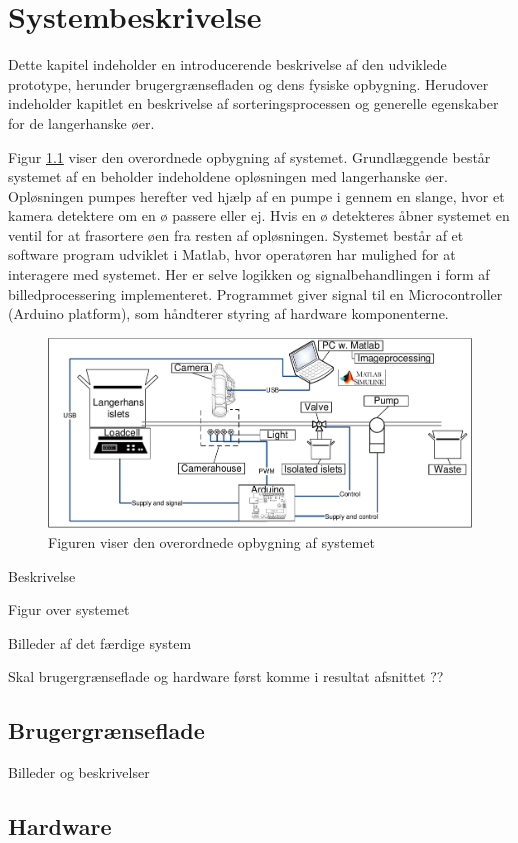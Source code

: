 \chapter{Systembeskrivelse}
Dette kapitel indeholder en introducerende beskrivelse af den udviklede prototype, herunder brugergrænsefladen og dens fysiske opbygning. Herudover indeholder kapitlet en beskrivelse af sorteringsprocessen og generelle egenskaber for de langerhanske øer.

Figur \ref{fig:system} viser den overordnede opbygning af systemet. Grundlæggende består systemet af en beholder indeholdene opløsningen med langerhanske øer. Opløsningen pumpes herefter ved hjælp af en pumpe i gennem en slange, hvor et kamera detektere om en ø passere eller ej. Hvis en ø detekteres åbner systemet en ventil for at frasortere øen fra resten af opløsningen. Systemet består af et software program udviklet i Matlab, hvor operatøren har mulighed for at interagere med systemet. Her er selve logikken og signalbehandlingen i form af billedprocessering implementeret. Programmet giver signal til en Microcontroller (Arduino platform), som håndterer styring af hardware komponenterne.

\begin{figure}[H]
	\centering
	\includegraphics[width=1\textwidth]{billeder/DMTS.pdf}
	\caption{Figuren viser den overordnede opbygning af systemet}
	\label{fig:system}
\end{figure}
Beskrivelse 

Figur over systemet

Billeder af det færdige system

Skal brugergrænseflade og hardware først komme i resultat afsnittet ?? 
\section{Brugergrænseflade}
Billeder og beskrivelser

\section{Hardware}


